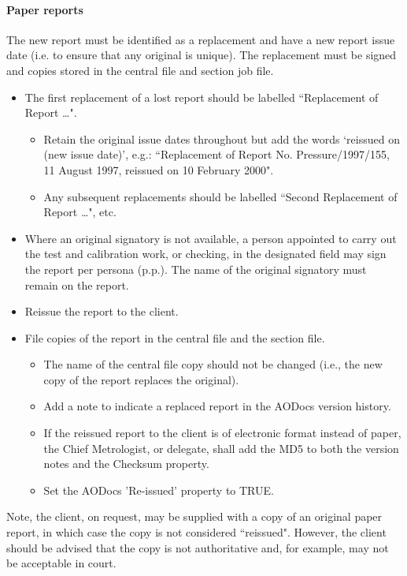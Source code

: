 \paragraph{Paper reports}
The new report must be identified as a replacement and have a new report issue date (i.e. to ensure that any original is unique). The replacement must be signed and copies stored in the central file and section job file. 
\begin{itemize}
\item The first replacement of a lost report should be labelled ``Replacement of Report \ldots". 
\begin{itemize}
\item Retain the original issue dates throughout but add the words `reissued on (new issue date)', e.g.: ``Replacement of Report No. Pressure/1997/155, 11 August 1997, reissued on 10 February 2000".
\item Any subsequent replacements should be labelled ``Second Replacement of Report \ldots", etc.
\end{itemize}

\item Where an original signatory is not available, a person appointed to carry out the test and calibration work, or checking, in the designated field may sign the report per persona (p.p.).  The name of the original signatory must remain on the report.

\item Reissue the report to the client.

\item File copies of the report in the central file and the section file.
\begin{itemize}
\item The name of the central file copy should not be changed (i.e., the new copy of the report replaces the original). 
\item Add a note to indicate a replaced report in the AODocs version history.
\item If the reissued report to the client is of electronic format instead of paper, the Chief Metrologist, or delegate, shall add the MD5 to both the version notes and the Checksum property.
\item Set the AODocs 'Re-issued' property to TRUE.
\end{itemize}
\end{itemize}

Note, the client, on request, may be supplied with a copy of an original paper report, in which case the copy is not considered ``reissued". However, the client should be advised that the copy is not authoritative and, for example, may not be acceptable in court.

